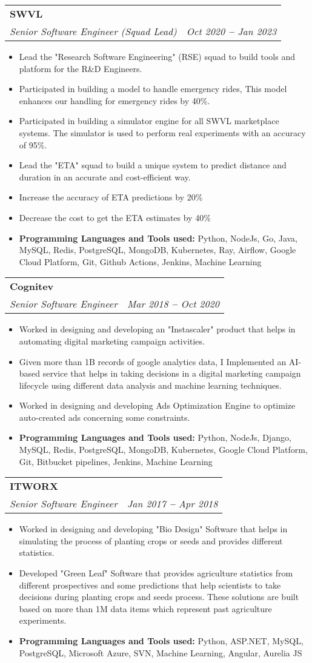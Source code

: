 \documentclass[letterpaper,11pt]{article}
\makeatletter
\newcommand{\resumeItem}[1]{
  \item\small{
    {#1 \vspace{-2pt}}
  }
}
\newcommand{\resumeSubheading}[4]{
  \vspace{-2pt}\item
    \begin{tabular*}{0.97\textwidth}[t]{l@{\extracolsep{\fill}}r}
      \textbf{#1} & #2 \\
      \textit{\small#3} & \textit{\small #4} \\
    \end{tabular*}\vspace{-7pt}
}
\newcommand{\resumeItemListStart}{\begin{itemize}}
\newcommand{\resumeItemListEnd}{\end{itemize}\vspace{-5pt}}
\makeatother
\begin{document}
	\resumeSubheading
		{SWVL}{}
		{Senior Software Engineer (Squad Lead)}{Oct 2020 \textbf{--} Jan 2023}
		\resumeItemListStart
		\resumeItem{Lead the "Research Software Engineering" (RSE) squad to build tools and platform for the R\&D Engineers.}
			\resumeItem{Participated in building a model to handle emergency rides, This model enhances our handling for emergency rides by 40\%.}
			\resumeItem{Participated in building a simulator engine for all SWVL marketplace systems. The simulator is used to perform real experiments with an accuracy of 95\%.}
			\resumeItem{Lead the "ETA" squad to build a unique system to predict distance and duration in an accurate and cost-efficient way.}
			\resumeItem{Increase the accuracy of ETA predictions by 20\%}
			\resumeItem{Decrease the cost to get the ETA estimates by 40\%}
			\resumeItem{\textbf{Programming Languages and Tools used:} Python, NodeJs, Go, Java, MySQL, Redis, PostgreSQL, MongoDB, Kubernetes, Ray,
			Airflow, Google Cloud Platform, Git, Github Actions, Jenkins, Machine Learning}
		  \resumeItemListEnd
	
	\resumeSubheading
		{Cognitev}{}
		{Senior Software Engineer }{Mar 2018 \textbf{--} Oct 2020}
		\resumeItemListStart
			\resumeItem{Worked in designing and developing an "Instascaler" product that helps in automating digital marketing campaign activities.}
			\resumeItem{Given more than 1B records of google analytics data, I Implemented an AI-based service that helps in taking decisions in a digital marketing campaign lifecycle using different data analysis and machine learning techniques.}
			\resumeItem{Worked in designing and developing Ads Optimization Engine to optimize auto-created ads concerning some constraints.}
			\resumeItem{\textbf{Programming Languages and Tools used:} Python, NodeJs, Django, MySQL, Redis, PostgreSQL, MongoDB, Kubernetes, Google Cloud Platform, Git, Bitbucket pipelines, Jenkins, Machine Learning}
		\resumeItemListEnd
	
	\resumeSubheading
		{ITWORX}{}
		{Senior Software Engineer }{Jan 2017 \textbf{--} Apr 2018}
		\resumeItemListStart
			\resumeItem{Worked in designing and developing "Bio Design" Software that helps in simulating the process of planting crops or seeds and provides different statistics.}
			\resumeItem{Developed "Green Leaf" Software that provides agriculture statistics from different prospectives and some predictions that help scientists to take decisions during planting crops and seeds process. These solutions are built based on more than 1M data items which represent past agriculture experiments.}
			\resumeItem{\textbf{Programming Languages and Tools used:} Python, ASP.NET, MySQL, PostgreSQL, Microsoft Azure, SVN, Machine Learning, Angular, Aurelia JS}
		\resumeItemListEnd
	
\end{document}
